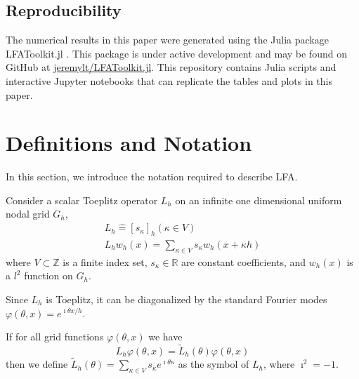 \documentclass[review]{siamart190516}
\begin{document}
\subsection{Reproducibility}\label{sec:reproducibility}

The numerical results in this paper were generated using the Julia package LFAToolkit.jl \cite{thompson2021toolkit}.
This package is under active development and may be found on GitHub at \href{https://github.com/jeremylt/LFAToolkit.jl}{jeremylt/LFAToolkit.jl}.
This repository contains Julia scripts and interactive Jupyter notebooks that can replicate the tables and plots in this paper.

\section{Definitions and Notation}\label{sec:notation}

In this section, we introduce the notation required to describe LFA.

Consider a scalar Toeplitz operator $L_h$ on an infinite one dimensional uniform nodal grid $G_h$,
\begin{equation}
\begin{split}
L_h \mathrel{\hat{=}} \left[ s_\kappa \right]_h \left( \kappa \in V \right)\\
L_h w_h \left( x \right) = \sum_{\kappa \in V} s_\kappa w_h \left( x + \kappa h \right)
\end{split}
\end{equation}
where $V \subset \mathbb{Z}$ is a finite index set, $s_\kappa \in \mathbb{R}$ are constant coefficients, and $w_h \left( x \right)$ is a $l^2$ function on $G_h$.

Since $L_h$ is Toeplitz, it can be diagonalized by the standard Fourier modes $\varphi \left( \theta, x \right) = e^{\imath \theta x / h}$.

\begin{definition}[Symbol of $L_h$]\label{def:symbol}
If for all grid functions $\varphi \left( \theta, x \right)$ we have
\begin{equation}
L_h \varphi \left( \theta, x \right) = \tilde{L}_h \left( \theta \right) \varphi \left( \theta, x \right)
\end{equation}
then we define $\tilde{L}_h \left( \theta \right) = \sum_{\kappa \in V} s_\kappa e^{\imath \theta \kappa}$ as the symbol of $L_h$, where $\imath^2 = -1$.
\end{definition}
\end{document}
